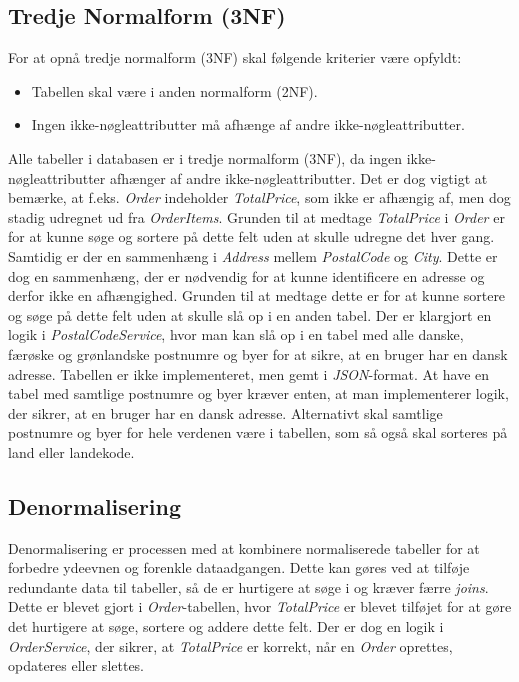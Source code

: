 \subsection{Tredje Normalform (3NF)}
For at opnå tredje normalform (3NF) skal følgende kriterier være opfyldt:
\begin{itemize}
    \item Tabellen skal være i anden normalform (2NF).
    \item Ingen ikke-nøgleattributter må afhænge af andre ikke-nøgleattributter.
\end{itemize}
Alle tabeller i databasen er i tredje normalform (3NF), da ingen ikke-nøgleattributter afhænger af andre ikke-nøgleattributter.
Det er dog vigtigt at bemærke, at f.eks. \emph{Order} indeholder \emph{TotalPrice}, som ikke er afhængig af, men dog stadig udregnet ud fra \emph{OrderItems}.
Grunden til at medtage \emph{TotalPrice} i \emph{Order} er for at kunne søge og sortere på dette felt uden at skulle udregne det hver gang.
Samtidig er der en sammenhæng i \emph{Address} mellem \emph{PostalCode} og \emph{City}. Dette er dog en sammenhæng, der er nødvendig for at kunne identificere en adresse og derfor ikke en afhængighed.
Grunden til at medtage dette er for at kunne sortere og søge på dette felt uden at skulle slå op i en anden tabel.
Der er klargjort en logik i \emph{PostalCodeService}, hvor man kan slå op i en tabel med alle danske, færøske og grønlandske postnumre og byer for at sikre, at en bruger har en dansk adresse.
Tabellen er ikke implementeret, men gemt i \emph{JSON}-format. At have en tabel med samtlige postnumre og byer kræver enten, at man implementerer logik, der sikrer, at en bruger har en dansk adresse. 
Alternativt skal samtlige postnumre og byer for hele verdenen være i tabellen, som så også skal sorteres på land eller landekode.

\subsection{Denormalisering}
Denormalisering er processen med at kombinere normaliserede tabeller for at forbedre ydeevnen og forenkle dataadgangen. 
Dette kan gøres ved at tilføje redundante data til tabeller, så de er hurtigere at søge i og kræver færre \emph{joins}.
Dette er blevet gjort i \emph{Order}-tabellen, hvor \emph{TotalPrice} er blevet tilføjet for at gøre det hurtigere at søge, sortere og addere dette felt.
Der er dog en logik i \emph{OrderService}, der sikrer, at \emph{TotalPrice} er korrekt, når en \emph{Order} oprettes, opdateres eller slettes.

